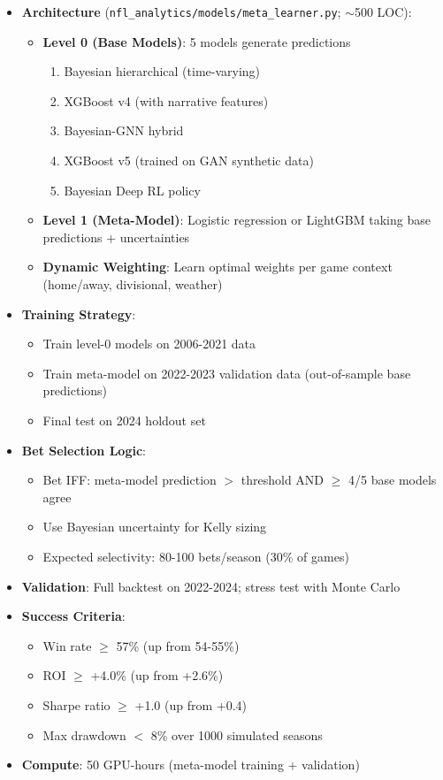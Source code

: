 \begin{itemize}
  \item {} \textbf{Architecture} (\texttt{nfl\_analytics/models/meta\_learner.py}; $\sim$500 LOC):
  \begin{itemize}
    \item \textbf{Level 0 (Base Models)}: 5 models generate predictions
    \begin{enumerate}
      \item Bayesian hierarchical (time-varying)
      \item XGBoost v4 (with narrative features)
      \item Bayesian-GNN hybrid
      \item XGBoost v5 (trained on GAN synthetic data)
      \item Bayesian Deep RL policy
    \end{enumerate}
    \item \textbf{Level 1 (Meta-Model)}: Logistic regression or LightGBM taking base predictions + uncertainties
    \item \textbf{Dynamic Weighting}: Learn optimal weights per game context (home/away, divisional, weather)
  \end{itemize}
  \item {} \textbf{Training Strategy}:
  \begin{itemize}
    \item Train level-0 models on 2006-2021 data
    \item Train meta-model on 2022-2023 validation data (out-of-sample base predictions)
    \item Final test on 2024 holdout set
  \end{itemize}
  \item {} \textbf{Bet Selection Logic}:
  \begin{itemize}
    \item Bet IFF: meta-model prediction $>$ threshold AND $\ge$ 4/5 base models agree
    \item Use Bayesian uncertainty for Kelly sizing
    \item Expected selectivity: 80-100 bets/season (30\% of games)
  \end{itemize}
  \item {} \textbf{Validation}: Full backtest on 2022-2024; stress test with Monte Carlo
  \item \textbf{Success Criteria}:
  \begin{itemize}
    \item Win rate $\ge$ 57\% (up from 54-55\%)
    \item ROI $\ge$ +4.0\% (up from +2.6\%)
    \item Sharpe ratio $\ge$ +1.0 (up from +0.4)
    \item Max drawdown $<$ 8\% over 1000 simulated seasons
  \end{itemize}
  \item \textbf{Compute}: 50 GPU-hours (meta-model training + validation)
\end{itemize}

